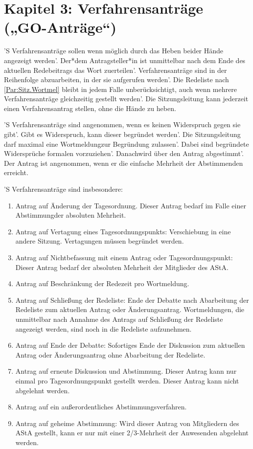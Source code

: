 \documentclass[fontsize=12pt,parskip=half, ref=short]{scrartcl}
\begin{document}
\section*{Kapitel 3: Verfahrensanträge („GO-Anträge“)}
\begin{contract}

  \label{Par:Verf}
  'S Verfahrensanträge sollen wenn möglich durch das Heben beider Hände
  angezeigt werden'. Der*dem Antragsteller*in ist unmittelbar nach dem Ende des
  aktuellen Redebeitrags das Wort zuerteilen'. Verfahrensanträge sind in der
  Reihenfolge abzuarbeiten, in der sie aufgerufen werden'. Die Redeliste nach
  \ref{Par:Sitz.Wortmel} bleibt in jedem Falle unberücksichtigt, auch wenn
  mehrere Verfahrensanträge gleichzeitig gestellt werden'. Die Sitzungsleitung
  kann jederzeit einen Verfahrensantrag stellen, ohne die Hände zu heben.

  'S Verfahrensanträge sind angenommen, wenn es keinen Widerspruch gegen sie
  gibt'. Gibt es Widerspruch, kann dieser begründet werden'. Die Sitzungsleitung
  darf maximal eine Wortmeldungzur Begründung zulassen'. Dabei sind begründete
  Widersprüche formalen vorzuziehen'. Danachwird über den Antrag abgestimmt'.
  Der Antrag ist angenommen, wenn er die einfache Mehrheit der Abstimmenden
  erreicht.

  'S Verfahrensanträge sind insbesondere:
  \begin{enumerate}
    \item Antrag auf Änderung der Tagesordnung. Dieser Antrag bedarf im
      Falle einer Abstimmungder absoluten Mehrheit.
    \item Antrag auf Vertagung eines Tagesordnungspunkts: Verschiebung in
      eine andere Sitzung. Vertagungen müssen begründet werden.
    \item Antrag auf Nichtbefassung mit einem Antrag oder Tagesordnungspunkt:
      Dieser Antrag bedarf der absoluten Mehrheit der Mitglieder des AStA.
    \item Antrag auf Beschränkung der Redezeit pro Wortmeldung.
    \item Antrag auf Schließung der Redeliste: Ende der Debatte nach
      Abarbeitung der Redeliste zum aktuellen Antrag oder Änderungsantrag.
      Wortmeldungen, die  unmittelbar nach Annahme des Antrags auf Schließung
      der Redeliste angezeigt werden, sind noch in die Redeliste aufzunehmen.
    \item Antrag auf Ende der Debatte: Sofortiges Ende der Diskussion zum
      aktuellen Antrag oder Änderungsantrag ohne Abarbeitung der Redeliste.
    \item Antrag auf erneute Diskussion und Abstimmung. Dieser Antrag kann
      nur einmal pro Tagesordnungspunkt gestellt werden. Dieser Antrag kann
      nicht abgelehnt werden.
    \item Antrag auf ein außerordentliches Abstimmungsverfahren.
    \item Antrag auf geheime Abstimmung: Wird dieser Antrag von Mitgliedern
      des AStA gestellt, kann er nur mit einer 2/3-Mehrheit der Anwesenden
      abgelehnt werden.
  \end{enumerate}
\end{contract}
\end{document}
